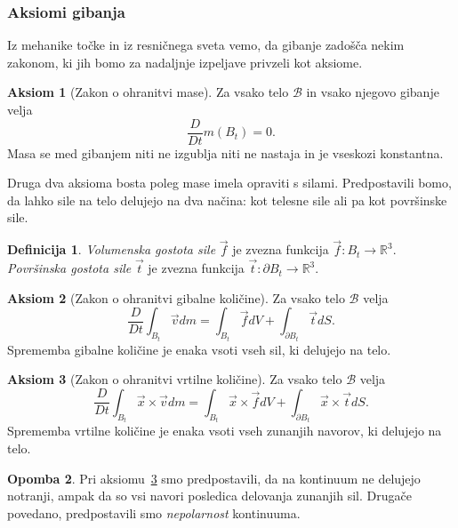 \documentclass[a4paper,twoside]{article}
\theoremstyle{definition} %
\newtheorem{definicija}{Definicija}[section]
\newtheorem{opomba}[definicija]{Opomba}
\newtheorem{aksiom}{Aksiom}
\theoremstyle{plain} %
\numberwithin{equation}{section}
\newcommand{\R}{\mathbb R}
\newcommand{\B}{\mathcal{B}}
\newcommand{\DD}[2]{\ensuremath{\frac{D #1}{D #2}}}
\newcommand{\DDt}[1]{\DD{#1}{t}}
\newcommand{\vv}{\vec{v}}
\newcommand{\vt}{\vec{t}}
\newcommand{\vf}{\vec{f}}
\newcommand{\vx}{\vec{x}}
\begin{document}
\subsubsection{Aksiomi gibanja}
Iz mehanike točke in iz resničnega sveta vemo, da gibanje zadošča nekim
zakonom, ki jih bomo za nadaljnje izpeljave privzeli kot aksiome.

\begin{aksiom}[Zakon o ohranitvi mase]
  \label{aks:masa}
  Za vsako telo $\B$ in vsako njegovo gibanje velja
  \begin{equation}
    \DDt{}m(B_t) = 0.
    \label{eq:masa}
  \end{equation}
  Masa se med gibanjem niti ne izgublja niti ne nastaja in je vseskozi
  konstantna.
\end{aksiom}

Druga dva aksioma bosta poleg mase imela opraviti s silami. Predpostavili bomo,
da lahko sile na telo delujejo na dva načina: kot telesne sile ali pa kot
površinske sile.

\begin{definicija}
  \emph{Volumenska gostota sile} $\vf$ je zvezna funkcija $\vf\colon B_t\to\R^3$.
  \emph{Površinska gostota sile} $\vt$ je zvezna funkcija $\vt\colon\partial B_t\to\R^3$.
\end{definicija}

\begin{aksiom}[Zakon o ohranitvi gibalne količine]
  \label{aks:gib}
  Za vsako telo $\B$ velja
  \begin{equation}
    \DDt{}\int_{B_t} \vv dm = \int_{B_t} \vf dV + \int_{\partial B_t} \vec t dS.
    \label{eq:gib}
  \end{equation}
  Sprememba gibalne količine je enaka vsoti vseh sil, ki delujejo na telo.
\end{aksiom}

\begin{aksiom}[Zakon o ohranitvi vrtilne količine]
  \label{aks:vrt}
  Za vsako telo $\B$ velja
  \begin{equation}
    \DDt{}\int_{B_t}\vx \times \vv dm = \int_{B_t} \vx \times \vf dV +
    \int_{\partial B_t} \vx\times\vt dS.
    \label{eq:vrt}
  \end{equation}
  Sprememba vrtilne količine je enaka vsoti vseh zunanjih navorov, ki delujejo
  na telo.
\end{aksiom}
\begin{opomba}
  Pri aksiomu~\ref{aks:vrt} smo predpostavili, da na kontinuum ne delujejo
  notranji, ampak da so vsi navori posledica delovanja zunanjih sil. Drugače
  povedano, predpostavili smo \emph{nepolarnost} kontinuuma.
\end{opomba}
\end{document}
